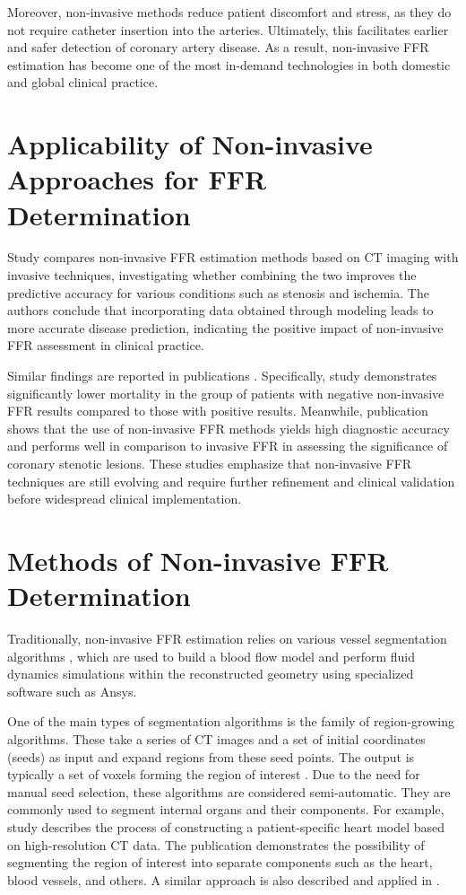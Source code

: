 \documentclass[default]{subfiles}
\begin{document}
Moreover, non-invasive methods reduce patient discomfort and stress, as they do not require catheter insertion into the
arteries. Ultimately, this facilitates earlier and safer detection of coronary artery disease. As a result,
non-invasive FFR estimation has become one of the most in-demand technologies in both domestic and global clinical
practice.

\section{Applicability of Non-invasive Approaches for FFR Determination}

Study \cite{lu2017ffr} compares non-invasive FFR estimation methods based on CT imaging with invasive techniques,
investigating whether combining the two improves the predictive accuracy for various conditions such as stenosis and
ischemia. The authors conclude that incorporating data obtained through modeling leads to more accurate disease
prediction, indicating the positive impact of non-invasive FFR assessment in clinical practice.

Similar findings are reported in publications \cite{patel2020advance, villines2020advance, norgaard2019ctffr,
agasthi2018meta}. Specifically, study \cite{patel2020advance} demonstrates significantly lower mortality in the group
of patients with negative non-invasive FFR results compared to those with positive results. Meanwhile, publication
\cite{agasthi2018meta} shows that the use of non-invasive FFR methods yields high diagnostic accuracy and performs
well in comparison to invasive FFR in assessing the significance of coronary stenotic lesions. These studies emphasize
that non-invasive FFR techniques are still evolving and require further refinement and clinical validation before
widespread clinical implementation.

\section{Methods of Non-invasive FFR Determination}

Traditionally, non-invasive FFR estimation relies on various vessel segmentation algorithms \cite{pal1993segmentation},
which are used to build a blood flow model and perform fluid dynamics simulations within the reconstructed geometry
using specialized software such as Ansys.

One of the main types of segmentation algorithms is the family of region-growing algorithms. These take a series of CT
images and a set of initial coordinates (seeds) as input and expand regions from these seed points. The output is
typically a set of voxels forming the region of interest \cite{revol1997regiongrow}. Due to the need for manual seed
selection, these algorithms are considered semi-automatic. They are commonly used to segment internal organs and their
components. For example, study \cite{bajaj2015heart} describes the process of constructing a patient-specific heart
model based on high-resolution CT data. The publication demonstrates the possibility of segmenting the region of
interest into separate components such as the heart, blood vessels, and others. A similar approach is also described
and applied in \cite{mcqueen2005heart}.
\end{document}
